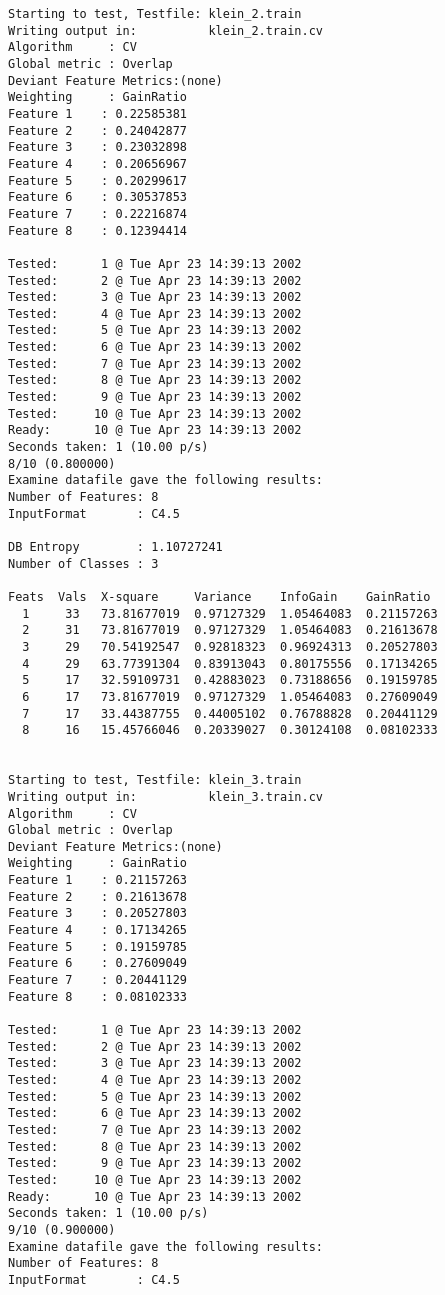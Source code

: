 \documentclass{article}
\begin{document}
\begin{verbatim}
Starting to test, Testfile: klein_2.train
Writing output in:          klein_2.train.cv
Algorithm     : CV
Global metric : Overlap
Deviant Feature Metrics:(none)
Weighting     : GainRatio
Feature 1	 : 0.22585381
Feature 2	 : 0.24042877
Feature 3	 : 0.23032898
Feature 4	 : 0.20656967
Feature 5	 : 0.20299617
Feature 6	 : 0.30537853
Feature 7	 : 0.22216874
Feature 8	 : 0.12394414

Tested:      1 @ Tue Apr 23 14:39:13 2002
Tested:      2 @ Tue Apr 23 14:39:13 2002
Tested:      3 @ Tue Apr 23 14:39:13 2002
Tested:      4 @ Tue Apr 23 14:39:13 2002
Tested:      5 @ Tue Apr 23 14:39:13 2002
Tested:      6 @ Tue Apr 23 14:39:13 2002
Tested:      7 @ Tue Apr 23 14:39:13 2002
Tested:      8 @ Tue Apr 23 14:39:13 2002
Tested:      9 @ Tue Apr 23 14:39:13 2002
Tested:     10 @ Tue Apr 23 14:39:13 2002
Ready:      10 @ Tue Apr 23 14:39:13 2002
Seconds taken: 1 (10.00 p/s)
8/10 (0.800000)
Examine datafile gave the following results:
Number of Features: 8
InputFormat       : C4.5

DB Entropy        : 1.10727241
Number of Classes : 3

Feats  Vals  X-square     Variance    InfoGain    GainRatio
  1     33   73.81677019  0.97127329  1.05464083  0.21157263
  2     31   73.81677019  0.97127329  1.05464083  0.21613678
  3     29   70.54192547  0.92818323  0.96924313  0.20527803
  4     29   63.77391304  0.83913043  0.80175556  0.17134265
  5     17   32.59109731  0.42883023  0.73188656  0.19159785
  6     17   73.81677019  0.97127329  1.05464083  0.27609049
  7     17   33.44387755  0.44005102  0.76788828  0.20441129
  8     16   15.45766046  0.20339027  0.30124108  0.08102333


Starting to test, Testfile: klein_3.train
Writing output in:          klein_3.train.cv
Algorithm     : CV
Global metric : Overlap
Deviant Feature Metrics:(none)
Weighting     : GainRatio
Feature 1	 : 0.21157263
Feature 2	 : 0.21613678
Feature 3	 : 0.20527803
Feature 4	 : 0.17134265
Feature 5	 : 0.19159785
Feature 6	 : 0.27609049
Feature 7	 : 0.20441129
Feature 8	 : 0.08102333

Tested:      1 @ Tue Apr 23 14:39:13 2002
Tested:      2 @ Tue Apr 23 14:39:13 2002
Tested:      3 @ Tue Apr 23 14:39:13 2002
Tested:      4 @ Tue Apr 23 14:39:13 2002
Tested:      5 @ Tue Apr 23 14:39:13 2002
Tested:      6 @ Tue Apr 23 14:39:13 2002
Tested:      7 @ Tue Apr 23 14:39:13 2002
Tested:      8 @ Tue Apr 23 14:39:13 2002
Tested:      9 @ Tue Apr 23 14:39:13 2002
Tested:     10 @ Tue Apr 23 14:39:13 2002
Ready:      10 @ Tue Apr 23 14:39:13 2002
Seconds taken: 1 (10.00 p/s)
9/10 (0.900000)
Examine datafile gave the following results:
Number of Features: 8
InputFormat       : C4.5


\end{verbatim}
\end{document}
